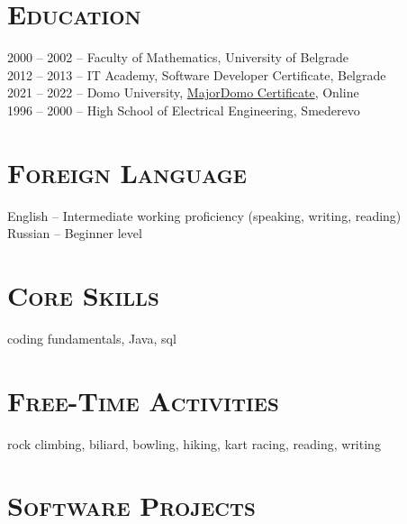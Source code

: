\documentclass[12pt]{article}
\begin{document}
\section{\textsc{Education}}

    2000 -- 2002 -- Faculty of Mathematics, University of Belgrade \\
    2012 -- 2013 -- IT Academy, Software Developer Certificate, Belgrade \\
    2021 -- 2022 -- Domo University, \href{https://drive.google.com/file/d/1i-GzyE43WospitxXdFWp2bRYe6wqZG48/view?usp=sharing}{MajorDomo Certificate}, Online \\
    1996 -- 2000 -- High School of Electrical Engineering, Smederevo

\section{\textsc{Foreign Language}} 

    English -- Intermediate working proficiency (speaking, writing, reading) \\
    Russian -- Beginner level

\section{\textsc{Core Skills}}
 
    coding fundamentals, Java, sql

\section{\textsc{Free-Time Activities}}

    rock climbing, biliard, bowling, hiking, kart racing, reading, writing

\pagebreak

\section{\textsc{Software Projects}}
\end{document}
